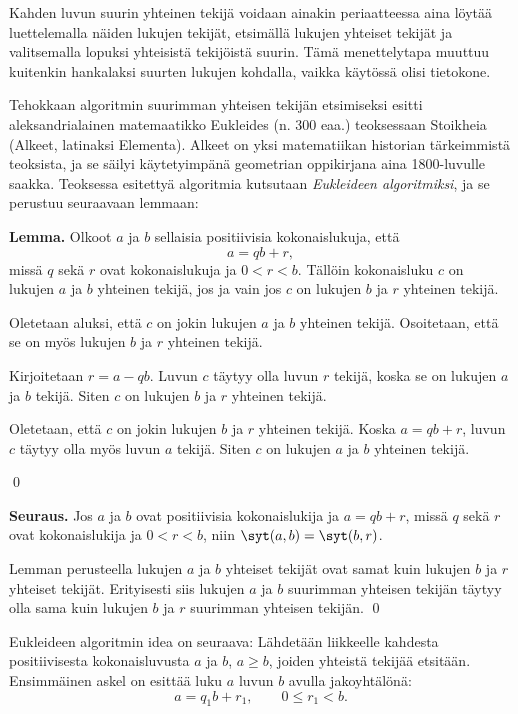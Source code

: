 Kahden luvun suurin yhteinen tekijä voidaan ainakin periaatteessa aina löytää luettelemalla näiden lukujen tekijät, etsimällä lukujen yhteiset tekijät ja valitsemalla lopuksi yhteisistä tekijöistä suurin. Tämä menettelytapa muuttuu kuitenkin hankalaksi suurten lukujen kohdalla, vaikka käytössä olisi tietokone.

Tehokkaan algoritmin suurimman yhteisen tekijän etsimiseksi esitti aleksandrialainen matemaatikko Eukleides (n. 300 eaa.) teoksessaan Stoikheia (Alkeet, latinaksi Elementa). Alkeet on yksi matematiikan historian tärkeimmistä teoksista, ja se säilyi käytetyimpänä geometrian oppikirjana aina 1800-luvulle saakka. Teoksessa esitettyä algoritmia kutsutaan {\em Eukleideen algoritmiksi}, ja se perustuu seuraavaan lemmaan:


{\bf Lemma.} Olkoot $a$ ja $b$ sellaisia positiivisia kokonaislukuja, että
\[
a=qb+r,
\]
missä $q$ sekä $r$ ovat kokonaislukuja ja $0<r<b$. Tällöin kokonaisluku $c$ on lukujen $a$ ja $b$ yhteinen tekijä, jos ja vain jos $c$ on lukujen $b$ ja $r$ yhteinen tekijä.

\proof
Oletetaan aluksi, että $c$ on jokin lukujen $a$ ja $b$ yhteinen tekijä. Osoitetaan, että se on myös lukujen $b$ ja $r$ yhteinen tekijä.

Kirjoitetaan $r=a-qb$. Luvun $c$ täytyy olla luvun $r$ tekijä, koska se on lukujen $a$ ja $b$ tekijä. Siten $c$ on lukujen $b$ ja $r$ yhteinen tekijä.

Oletetaan, että $c$ on jokin lukujen $b$ ja $r$ yhteinen tekijä. Koska $a=qb+r$, luvun $c$ täytyy olla myös luvun $a$ tekijä. Siten $c$ on lukujen $a$ ja $b$ yhteinen tekijä.

\qed

{\bf Seuraus.} Jos $a$ ja $b$ ovat positiivisia kokonaislukija ja $a=qb+r$, missä $q$ sekä $r$ ovat kokonaislukija ja $0<r<b$, niin $\syt(a,b)=\syt(b,r)$.

\proof
Lemman perusteella lukujen $a$ ja $b$ yhteiset tekijät ovat samat kuin lukujen $b$ ja $r$ yhteiset tekijät. Erityisesti siis lukujen $a$ ja $b$ suurimman yhteisen tekijän täytyy olla sama kuin lukujen $b$ ja $r$ suurimman yhteisen tekijän.
\qed



Eukleideen algoritmin idea on seuraava: Lähdetään liikkeelle kahdesta positiivisesta kokonaisluvusta $a$ ja $b$, $a\ge b$, joiden yhteistä tekijää etsitään. Ensimmäinen askel on esittää luku $a$ luvun $b$ avulla jakoyhtälönä:
\[
a=q_1b + r_1, \qquad 0 \le r_1 < b.
\]

